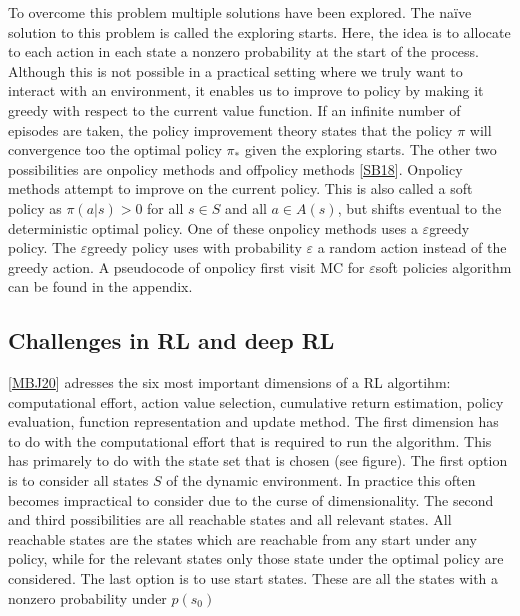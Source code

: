 \documentclass[letterpaper,10pt,english]{jupyterBook}
\begin{document}
\sphinxAtStartPar
To overcome this problem multiple solutions have been explored. The naïve solution to this problem is called the exploring starts. Here, the idea is to allocate to each action in each state a nonzero probability at the start of the process. Although this is not possible in a practical setting where we truly want to interact with an environment, it enables us to improve to policy by making it greedy with respect to the current value function. If an infinite number of episodes are taken, the policy improvement theory states that the policy \(\pi\) will convergence too the optimal policy \(\pi_*\) given the exploring starts. The other two possibilities are on\sphinxhyphen{}policy methods and off\sphinxhyphen{}policy methods {[}\hyperlink{cite.Financial_application:id70}{SB18}{]}. On\sphinxhyphen{}policy methods attempt to improve on the current policy. This is also called a soft policy as \(\pi(a|s) > 0\) for all \(s \in S\) and all \( a \in A(s)\), but shifts eventual to the deterministic optimal policy. One of these on\sphinxhyphen{}policy methods uses a \(\varepsilon\)\sphinxhyphen{}greedy policy. The \(\varepsilon\)\sphinxhyphen{}greedy policy uses with probability \(\varepsilon\) a random action instead of the greedy action. A pseudocode of on\sphinxhyphen{}policy first visit MC for \(\varepsilon\)\sphinxhyphen{}soft policies algorithm can be found in the appendix.


\subsection{Challenges in RL and deep RL}
\label{\detokenize{Reinforcement_learning:challenges-in-rl-and-deep-rl}}
\sphinxAtStartPar
{[}\hyperlink{cite.Financial_application:id24}{MBJ20}{]} adresses the six most important dimensions of a RL algortihm: computational effort, action value selection, cumulative return estimation, policy evaluation, function representation and update method. The first dimension has to do with the computational effort that is required to run the algorithm. This has primarely to do with the state set that is chosen (see figure). The first option is to consider all states \(S\) of the dynamic environment. In practice this often becomes impractical to consider due to the curse of dimensionality. The second and third possibilities are all reachable states and all relevant states. All reachable states are the states which are reachable from any start under any policy, while for the relevant states only those state under the optimal policy are considered. The last option is to use start states. These are all the states with a non\sphinxhyphen{}zero probability under \(p(s_0)\)
\end{document}
